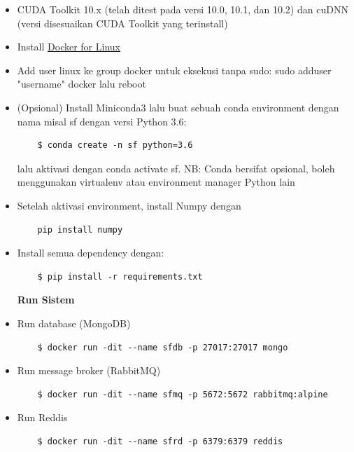 \begin{itemize}
  \item CUDA Toolkit 10.x (telah ditest pada versi 10.0, 10.1, dan 10.2) dan cuDNN (versi disesuaikan CUDA Toolkit yang terinstall)
  \item Install \href{https://docs.docker.com/engine/install/ubuntu/}{Docker for Linux}
  \item Add user linux ke group docker untuk eksekusi tanpa sudo: sudo adduser "username" docker lalu reboot
  \item (Opsional) Install Miniconda3 lalu buat sebuah conda environment dengan nama misal sf dengan versi Python 3.6:
  
  \begin{lstlisting}
    $ conda create -n sf python=3.6
  \end{lstlisting}

  lalu aktivasi dengan conda activate sf.
  NB: Conda bersifat opsional, boleh menggunakan virtualenv atau environment manager Python lain

  \item Setelah aktivasi environment, install Numpy dengan
  \begin{lstlisting}
    pip install numpy
  \end{lstlisting}  

  \item Install semua dependency dengan:
  
  \begin{lstlisting}
    $ pip install -r requirements.txt
  \end{lstlisting}

  \textbf{Run Sistem}
  \item Run database (MongoDB)
  
  \begin{lstlisting}
    $ docker run -dit --name sfdb -p 27017:27017 mongo
  \end{lstlisting}

  \item Run message broker (RabbitMQ)
  
  \begin{lstlisting}
    $ docker run -dit --name sfmq -p 5672:5672 rabbitmq:alpine
  \end{lstlisting}

  \item Run Reddis
  
  \begin{lstlisting}
    $ docker run -dit --name sfrd -p 6379:6379 reddis
  \end{lstlisting}


\end{itemize}
